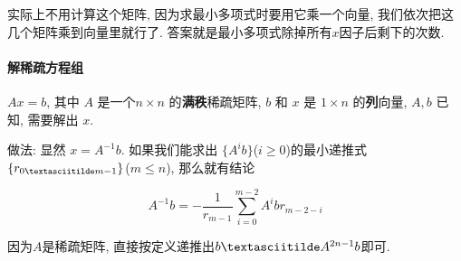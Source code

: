 	实际上不用计算这个矩阵, 因为求最小多项式时要用它乘一个向量, 我们依次把这几个矩阵乘到向量里就行了. 答案就是最小多项式除掉所有$x$因子后剩下的次数.

\paragraph*{解稀疏方程组}

	$Ax = b$, 其中 $A$ 是一个$n \times n$ 的\textbf{满秩}稀疏矩阵, $b$ 和 $x$ 是 $1\times n$ 的\textbf{列}向量, $A, b$ 已知, 需要解出 $x$.

	做法: 显然 $x = A^{-1} b$. 如果我们能求出 $\{A^i b\}$($i \ge 0$)的最小递推式$\{r_{0 \textasciitilde m - 1}\}$($m \le n$), 那么就有结论

	$$ A^{-1} b = -\frac 1 {r_{m - 1}} \sum_{i = 0} ^ {m - 2} A^i b r_{m - 2 - i} $$

	因为$A$是稀疏矩阵, 直接按定义递推出$b \textasciitilde A^{2n - 1} b$即可.
	
	\inputminted{cpp}{src/Math/解稀疏方程组.cpp}